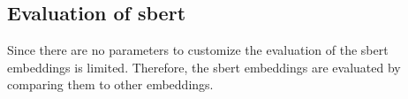 \subsection*{Evaluation of \ac{sbert}}\label{subsec:evaluation-sbert}

Since there are no parameters to customize the evaluation of the \ac{sbert} embeddings is limited.
Therefore, the \ac{sbert} embeddings are evaluated by comparing them to other embeddings.